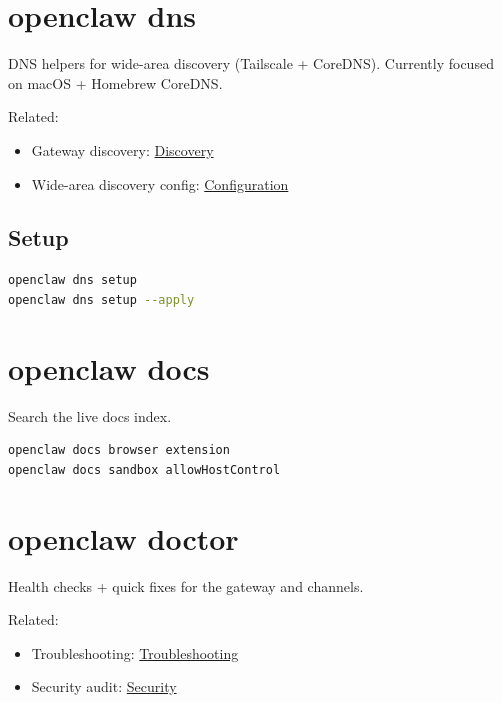 \clearpage

\section{openclaw dns}


DNS helpers for wide-area discovery (Tailscale + CoreDNS). Currently focused on macOS + Homebrew CoreDNS.

Related:

\begin{itemize}
  \item Gateway discovery: \href{/gateway/discovery}{Discovery}
  \item Wide-area discovery config: \href{/gateway/configuration}{Configuration}
\end{itemize}


\subsection{Setup}


\begin{lstlisting}[language=bash]
openclaw dns setup
openclaw dns setup --apply
\end{lstlisting}



\clearpage

\section{openclaw docs}


Search the live docs index.

\begin{lstlisting}[language=bash]
openclaw docs browser extension
openclaw docs sandbox allowHostControl
\end{lstlisting}



\clearpage

\section{openclaw doctor}


Health checks + quick fixes for the gateway and channels.

Related:

\begin{itemize}
  \item Troubleshooting: \href{/gateway/troubleshooting}{Troubleshooting}
  \item Security audit: \href{/gateway/security}{Security}
\end{itemize}


